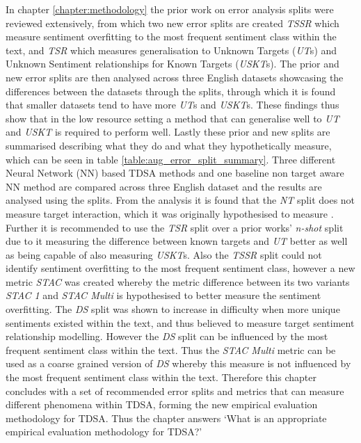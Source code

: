 In chapter \ref{chapter:methodology} the prior work on error analysis splits were reviewed extensively, from which two new error splits are created \textit{TSSR} which measure sentiment overfitting to the most frequent sentiment class within the text, and \textit{TSR} which measures generalisation to Unknown Targets (\textit{UT}s) and Unknown Sentiment relationships for Known Targets (\textit{USKT}s). The prior and new error splits are then analysed across three English datasets showcasing the differences between the datasets through the splits, through which it is found that smaller datasets tend to have more \textit{UT}s and \textit{USKT}s. These findings thus show that in the low resource setting a method that can generalise well to \textit{UT} and \textit{USKT} is required to perform well. Lastly these prior and new splits are summarised describing what they do and what they hypothetically measure, which can be seen in table \ref{table:aug_error_split_summary}. Three different Neural Network (NN) based TDSA methods and one baseline non target aware NN method are compared across three English dataset and the results are analysed using the splits. From the analysis it is found that the \textit{NT} split does not measure target interaction, which it was originally hypothesised to measure \citep{zhang-etal-2019-aspect}. Further it is recommended to use the \textit{TSR} split over a prior works' \textit{n-shot} split due to it measuring the difference between known targets and \textit{UT} better as well as being capable of also measuring \textit{USKT}s. Also the \textit{TSSR} split could not identify sentiment overfitting to the most frequent sentiment class, however a new metric \textit{STAC} was created whereby the metric difference between its two variants \textit{STAC 1} and \textit{STAC Multi} is hypothesised to better measure the sentiment overfitting. The \textit{DS} split was shown to increase in difficulty when more unique sentiments existed within the text, and thus believed to measure target sentiment relationship modelling. However the \textit{DS} split can be influenced by the most frequent sentiment class within the text. Thus the \textit{STAC Multi} metric can be used as a coarse grained version of \textit{DS} whereby this measure is not influenced by the most frequent sentiment class within the text. Therefore this chapter concludes with a set of recommended error splits and metrics that can measure different phenomena within TDSA, forming the new empirical evaluation methodology for TDSA. Thus the chapter answers  `What is an appropriate empirical evaluation methodology for TDSA?'

